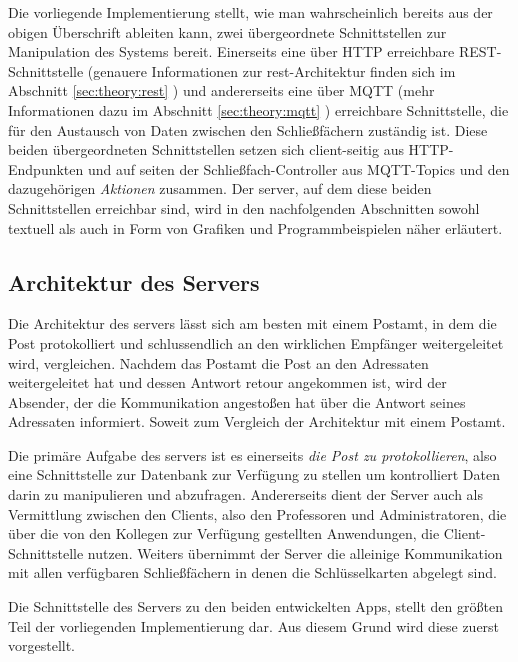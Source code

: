 \noindent
Die vorliegende Implementierung stellt, wie man wahrscheinlich bereits aus der obigen Überschrift ableiten kann, zwei übergeordnete Schnittstellen zur Manipulation des Systems bereit. Einerseits eine über HTTP erreichbare REST-Schnittstelle (genauere Informationen zur \acrshort{rest}-Architektur finden sich im Abschnitt \ref{sec:theory:rest} ) und andererseits eine über MQTT (mehr Informationen dazu im Abschnitt \ref{sec:theory:mqtt} ) erreichbare Schnittstelle, die für den Austausch von Daten zwischen den Schließfächern zuständig ist. Diese beiden übergeordneten Schnittstellen setzen sich client-seitig aus HTTP-Endpunkten und auf seiten der Schließfach-Controller aus MQTT-Topics und den dazugehörigen \textit{Aktionen} zusammen. Der \gls{server}, auf dem diese beiden Schnittstellen erreichbar sind, wird in den nachfolgenden Abschnitten sowohl textuell als auch in Form von Grafiken und Programmbeispielen näher erläutert. 

\subsection{Architektur des Servers}
Die Architektur des \gls{server}s lässt sich am besten mit einem Postamt, in dem die Post protokolliert und schlussendlich an den wirklichen Empfänger weitergeleitet wird, vergleichen. Nachdem das Postamt die Post an den Adressaten weitergeleitet hat und dessen Antwort retour angekommen ist, wird der Absender, der die Kommunikation angestoßen hat über die Antwort seines Adressaten informiert. Soweit zum Vergleich der Architektur mit einem Postamt.\bigskip

\noindent
Die primäre Aufgabe des \gls{server}s ist es einerseits \textit{die Post zu protokollieren}, also eine Schnittstelle zur Datenbank zur Verfügung zu stellen um kontrolliert Daten darin zu manipulieren und abzufragen. Andererseits dient der Server auch als Vermittlung zwischen den Clients, also den Professoren und Administratoren, die über die von den Kollegen zur Verfügung gestellten Anwendungen, die Client-Schnittstelle nutzen. Weiters übernimmt der Server die alleinige Kommunikation mit allen verfügbaren Schließfächern in denen die Schlüsselkarten abgelegt sind.\bigskip

\noindent
Die Schnittstelle des Servers zu den beiden entwickelten Apps, stellt den größten Teil der vorliegenden Implementierung dar. Aus diesem Grund wird diese zuerst vorgestellt.

